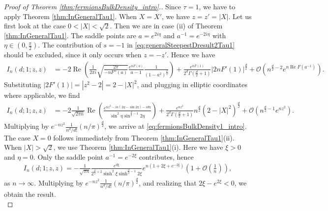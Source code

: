 \documentclass[%
 jmp,
cp,  %
 amsmath,amsthm,amssymb,%
 reprint,%
onecolumn]{revtex4-2}
\begin{document}
\begin{proof}[Proof of Theorem \ref{thm:fermionsBulkDensity_intro}.]
Since $\tau=1$, we have to apply Theorem \ref{thm:InGeneralTau1}. When $X=X'$, we have $z=z'=\lvert X\rvert$. Let us first look at the case $0<\lvert X\rvert < \sqrt 2$. Then we are in case (ii) of Theorem \ref{thm:InGeneralTau1}. The saddle points are $a=e^{2i\eta}$ and $a^{-1}=e^{-2i\eta}$ with $\eta\in (0,\frac{\pi}{2})$. The contribution of $s=-1$ in \eqref{eq:generalSteepestDresult2Tau1} should be excluded, since it only occurs when $z=-z'$. Hence we have
\begin{align*}
I_n(d;1;z,z) &= -2\operatorname{Re}\left( \frac{1}{2\pi i} \sqrt{\frac{2\pi}{- n F''(a)}} \frac{e^{n F(a)}}{a-1} \frac{1}{(1-a^2)^\frac{d}{2}} \right) +  \frac{e^{n F(1)}}{2^d \Gamma\left(\frac{d}{2}+1\right)} \lvert 2 n F'(1)\rvert^\frac{d}{2} 
+ \mathcal O\left(n^{\frac{d}{2}-2} e^{n \operatorname{Re} F(a^{-1})}\right).
\end{align*}
Substituting $|2 F'(1)| = |z^2-2| = 2-|X|^2$, and plugging in elliptic coordinates where applicable, we find
\begin{align*}
I_n(d;1;z,z) &=
-2\frac{1}{\sqrt{2\pi n}} \operatorname{Re}\left(\frac{e^{n z^2 - i n(2\eta-\sin 2\eta) - i d \eta}}{\sin^2 \eta \sin^{\frac{d}{2}-1}2\eta} \right)
+ \frac{e^{n z^2}}{2^d \Gamma\left(\frac{d}{2}+1\right)} n^\frac{d}{2} (2-|X|^2)^\frac{d}{2} 
+ \mathcal O\left(n^{\frac{d}{2}-1} e^{n z^2}\right).
\end{align*}
Multiplying by $e^{-n z^2} \frac{1}{n^d/d!} (n/\pi)^{\frac{d}{2}}$, we arrive at \eqref{eq:fermionsBulkDensity1_intro}. The case $X=0$ follows immediately from Theorem \ref{thm:InGeneralTau1}(ii). 
When $\lvert X\rvert >\sqrt 2$, we use Theorem \ref{thm:InGeneralTau1}(i). Here we have $\xi>0$ and $\eta=0$. Only the saddle point $a^{-1} = e^{-2\xi}$ contributes, hence
\begin{align*}
I_n(d;1;z,z) = - \frac{1}{\sqrt{\pi n}} \frac{e^{d\xi}}{2^{\frac{d}{2}+2}\sinh^2 \xi \sinh^{\frac{d}{2}-1} 2\xi} e^{n(1+2\xi+e^{-2\xi})}
\left(1+\mathcal O\left(\frac{1}{n}\right)\right),
\end{align*}
as $n\to\infty$. Multiplying by $e^{-n z^2} \frac{1}{n^d/d!} (n/\pi)^{\frac{d}{2}}$, and realizing that $2\xi - e^{2\xi} < 0$, we obtain the result.\\
\end{proof}

\end{document}
